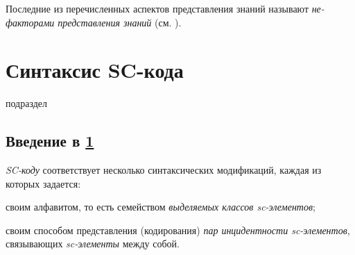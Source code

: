 Последние из перечисленных аспектов представления знаний называют \textit{не-факторами представления знаний} (см. ).

\section{Синтаксис SC-кода}
\label{sec_sr_scsyntax}

\begin{SCn}
	\begin{scnrelfromlist}{подраздел}
	\end{scnrelfromlist}
\end{SCn}

\subsection*{Введение в \ref{sec_sr_scsyntax}}
\textit{SC-коду} соответствует несколько синтаксических модификаций, каждая из которых задается:
\begin{textitemize}
	\item своим алфавитом, то есть семейством \textit{ выделяемых классов sc-элементов};
	\item своим способом представления (кодирования) \textit{пар инцидентности sc-элементов}, связывающих \textit{sc-элементы} между собой.
\end{textitemize}

\begin{SCn}
\end{SCn}

